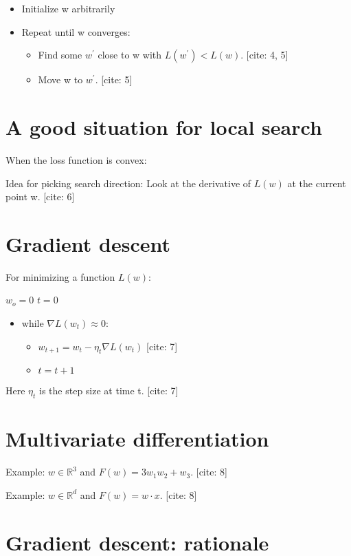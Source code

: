 \documentclass{article}
\begin{document}
\begin{itemize}
    \item Initialize w arbitrarily
    \item Repeat until w converges:
    \begin{itemize}
        \item Find some $w^{\prime}$ close to w with $L(w^{\prime})<L(w)$. [cite: 4, 5]
        \item Move w to $w^{\prime}$. [cite: 5]
    \end{itemize}
\end{itemize}

\section{A good situation for local search}

When the loss function is convex:

Idea for picking search direction: Look at the derivative of $L(w)$ at the current point w. [cite: 6]

\section{Gradient descent}

For minimizing a function $L(w)$:

$w_{o}=0$ $t=0$

\begin{itemize}
    \item while $\nabla L(w_{t})\approx0:$
    \begin{itemize}
        \item $w_{t+1}=w_{t}-\eta_{t}\nabla L(w_{t})$  [cite: 7]
        \item $t=t+1$
    \end{itemize}
\end{itemize}

Here $\eta_{t}$ is the step size at time t. [cite: 7]

\section{Multivariate differentiation}

Example: $w\in\mathbb{R}^{3}$ and $F(w)=3w_{1}w_{2}+w_{3}.$  [cite: 8]

Example: $w\in\mathbb{R}^{d}$ and $F(w)=w\cdot x.$ [cite: 8]

\section{Gradient descent: rationale}
\end{document}
